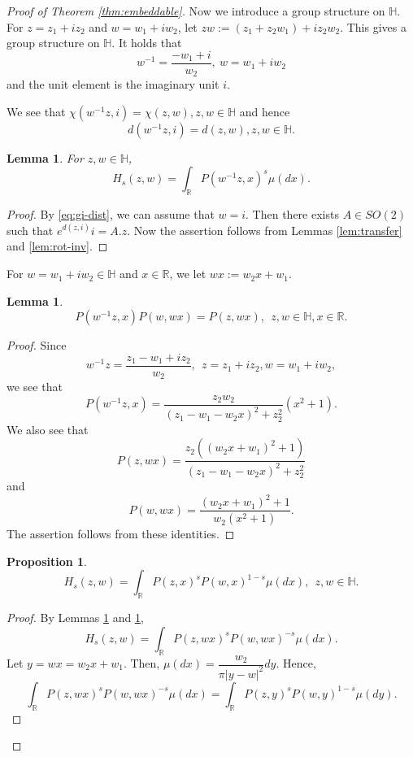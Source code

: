 \documentclass[journal]{IEEEtran}
\newtheorem{lemma}[theorem]{Lemma}
\newtheorem{proposition}[theorem]{Proposition}
\begin{document}
\begin{proof}[Proof of Theorem \ref{thm:embeddable}]
Now we introduce a group structure on $\mathbb H$. 
For $z = z_1+iz_2$ and $w = w_1+iw_2$, let $zw := (z_1 + z_2 w_1) + i z_2 w_2$.
This gives a group structure on $\mathbb H$. 
It holds that 
$$ w^{-1} = \frac{-w_1 + i}{w_2}, \ w = w_1+iw_2$$
and the unit element is the imaginary unit $i$. 

We see that 
$\chi(w^{-1}z,i) = \chi(z,w), z,w \in \mathbb H$ and hence 
\begin{equation}\label{eq:gi-dist}
d(w^{-1}z,i) = d(z,w), z,w \in \mathbb H.
\end{equation} 



\begin{lemma}\label{lem:inverse}
For $z,w \in \mathbb H$, 
\[ H_s (z,w) = \int_{\mathbb R} P(w^{-1} z, x)^s \mu(dx).  \]
\end{lemma}


\begin{proof}
By \eqref{eq:gi-dist}, we can assume that $w=i$. 
Then there exists $A \in SO(2)$ such that $e^{d(z,i)} i = A.z$. 
Now the assertion follows from Lemmas \ref{lem:transfer} and \ref{lem:rot-inv}. 
\end{proof}

For $w = w_1 + iw_2 \in \mathbb H$ and $x \in \mathbb R$, 
we let $wx := w_2 x + w_1$.

\begin{lemma}\label{lem:ratio}
\[ P(w^{-1}z, x) P(w, wx) = P(z, wx), \ \ z, w \in \mathbb H, x \in \mathbb R. \]
\end{lemma}

\begin{proof}
Since 
\[ w^{-1}z = \frac{z_1 - w_1 + i z_2}{w_2}, \ \ z = z_1 + iz_2, w = w_1 + iw_2, \]
we see that 
\[ P(w^{-1}z, x) = \frac{z_2 w_2}{(z_1 - w_1 - w_2 x)^2 + z_2^2} (x^2 + 1). \]
We also see that 
\[ P(z,wx) = \frac{z_2 ((w_2 x + w_1)^2+1)}{(z_1 - w_1 - w_2 x)^2 + z_2^2} \] 
and \[ P(w,wx) = \frac{(w_2 x + w_1)^2+1}{w_2 (x^2 + 1)}. \]
The assertion follows from these identities. 
\end{proof}

\begin{proposition}\label{prop:prop1}
\[ H_s (z,w) = \int_{\mathbb R} P(z,x)^s P(w,x)^{1-s} \mu(dx), \ \ z, w \in \mathbb H.\] 
\end{proposition}

\begin{proof}
By Lemmas \ref{lem:inverse} and \ref{lem:ratio}, 
\[ H_s (z,w) = \int_{\mathbb R} P(z, wx)^s P(w, wx)^{-s} \mu(dx). \]
Let $y = wx = w_2 x + w_1$. 
Then, $\mu(dx) = \dfrac{w_2}{\pi |y-w|^2} dy$. 
Hence, 
\[ \int_{\mathbb R} P(z, wx)^s P(w, wx)^{-s} \mu(dx) = \int_{\mathbb R} P(z,y)^s P(w,y)^{1-s} \mu(dy). \]
\end{proof}


\end{proof}
\end{document}
